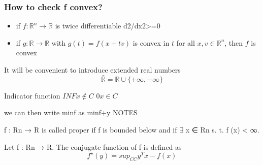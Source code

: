 \subsubsection{How to check f convex?}
\begin{itemize}
	\item if $f: \mathbb{R}^n \rightarrow{} \mathbb{R}$ is twice differentiable d2/dx2>=0
	\item if $g: \mathbb{R} \rightarrow{} \mathbb{R}$ with $g(t)=f(x+tv)$
	      is convex in $t$ for all $x,v \in \mathbb{R}^{n}$, then $f$ is convex
\end{itemize}

\rightarrow{} It will be convenient to introduce extended real numbers
$$\bar{\mathbb{R}} = \mathbb{R} \cup \{+\infty, -\infty\}$$


\rightarrow{} Indicator function
$INF x \notin C$
$0 x \in C$

\rightarrow{} we can then write minf as minf+y NOTES


\begin{definition}[3]
	f : Rn → R is called proper if f is bounded below and if $∃$ x ∈ Rn s. t. f (x) < ∞.
\end{definition}

\begin{definition}
	Let f : Rn → R. The conjugate function of f is defined as
	$$f^\star (y) = sup_{CC} y^Tx-f(x)$$
\end{definition}

